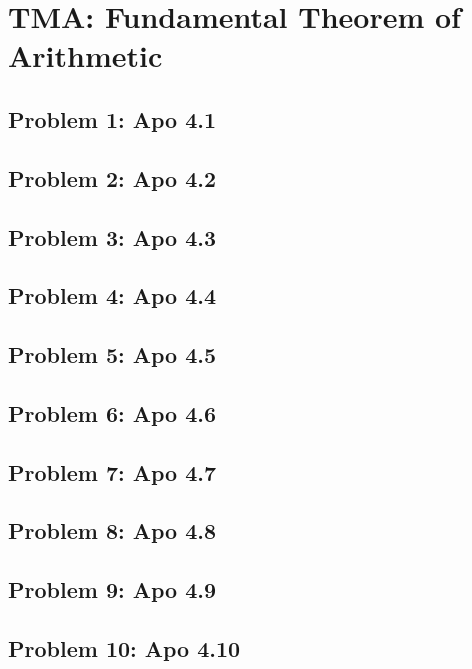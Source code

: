 \section{TMA: Fundamental Theorem of Arithmetic}

\subsection[Problem 1]{Problem 1: Apo 4.1}

\subsection[Problem 2]{Problem 2: Apo 4.2}

\subsection[Problem 3]{Problem 3: Apo 4.3}

\subsection[Problem 4]{Problem 4: Apo 4.4}

\subsection[Problem 5]{Problem 5: Apo 4.5}

\subsection[Problem 6]{Problem 6: Apo 4.6}

\subsection[Problem 7]{Problem 7: Apo 4.7}

\subsection[Problem 8]{Problem 8: Apo 4.8}

\subsection[Problem 9]{Problem 9: Apo 4.9}

\subsection[Problem 10]{Problem 10: Apo 4.10}